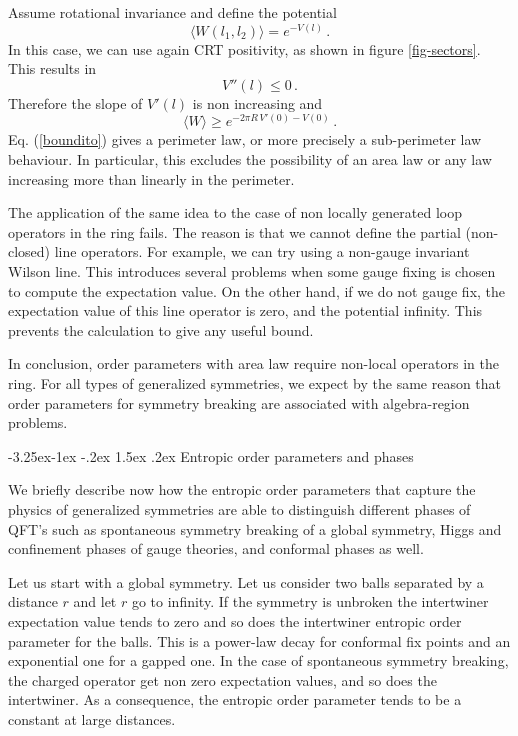 \documentclass[11pt]{article}
\makeatletter
\renewcommand\subsection{\@startsection{subsection}{2}{\z@}%
                                   {-3.25ex\@plus -1ex \@minus -.2ex}%
                                     {1.5ex \@plus .2ex}%
                                     {\normalfont\bfseries}}
\numberwithin{equation}{section}
\newcommand{\be}{\begin{equation}}
\newcommand{\ee}{\end{equation}}
\makeatother
\begin{document}
Assume rotational invariance and define the potential
\be
\langle W(l_1,l_2)\rangle =e^{-V(l)}\,.\label{hh}
\ee
 In this case, we can use again CRT positivity, as shown in figure \ref{fig-sectors}. This results in
\be 
 V''(l)\le 0\,.
\ee   
Therefore the slope of $V'(l)$ is non increasing and
\be
\langle W \rangle \ge e^{-2 \pi R \,V'(0)-V(0)} \,. \label{boundito}
\ee
 Eq. (\ref{boundito}) gives a perimeter law, or more precisely a sub-perimeter law behaviour. In particular, this excludes the possibility of an area law or any law increasing more than linearly in the perimeter.   

The application of the same idea to the case of non locally generated loop operators in the ring fails. The reason is that we cannot define the partial (non-closed) line operators. For example, we can try using a non-gauge invariant Wilson line.  This introduces several problems when some gauge fixing is chosen to compute the expectation value. On the other hand, if we do not gauge fix, the expectation value of this line operator is zero, and the potential infinity. This prevents the calculation to give any useful bound.   

In conclusion, order parameters with area law require non-local operators in the ring. For all types of generalized symmetries, we expect by the same reason that order parameters for symmetry breaking are associated with algebra-region problems.  





\subsection{Entropic order parameters and phases}

We briefly describe now how the entropic order parameters that capture the physics of generalized symmetries are able to distinguish different phases of QFT's such as spontaneous symmetry breaking of a global symmetry, Higgs and confinement phases of gauge theories, and conformal phases as well. 


Let us start with a global symmetry. Let us consider two balls separated by a distance $r$ and let $r$ go to infinity. If the symmetry is unbroken the intertwiner expectation value tends to zero and so does the intertwiner entropic order parameter for the balls. This is a power-law decay for conformal fix points and an exponential one for a gapped one. 
In the case of spontaneous symmetry breaking, the charged operator get non zero expectation values, and so does the intertwiner.  As a consequence, the entropic order parameter tends to be a constant at large distances.
\end{document}
